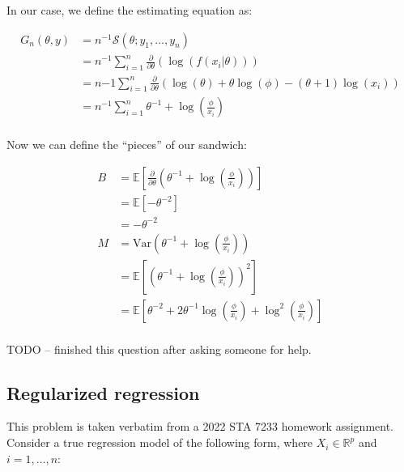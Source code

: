 \documentclass{report}
\begin{document}
In our case, we define the estimating equation as:

\begin{equation}\label{eq:ex-ols-pareto-estimating-equation}
    \begin{aligned}
        G_n(\theta, y) 
          &= n^{-1} \mathcal{S}(\theta; y_1, \dots, y_n) \\
          &= n^{-1} \sum_{i=1}^n \frac{\partial}{\partial\theta} \left(\log(f(x_i | \theta))\right) \\
          &= n{-1} \sum_{i=1}^n \frac{\partial}{\partial\theta} \left(\log(\theta) + \theta\log(\phi) - (\theta + 1)\log(x_i)\right) \\
          &= n^{-1} \sum_{i=1}^n \theta^{-1} + \log\left(\frac{\phi}{x_i}\right) \\
    \end{aligned}
\end{equation}

Now we can define the ``pieces'' of our sandwich:

\begin{equation}\label{eq:ex-ols-pareto-sandwich-pieces}
    \begin{aligned}
        B 
          &= \mathbb{E}\left[\frac{\partial}{\partial\theta} \left(\theta^{-1} + \log\left(\frac{\phi}{x_i}\right)\right)\right] \\
          &= \mathbb{E}\left[-\theta^{-2}\right] \\
          &= -\theta^{-2} \\
        M 
          &= \text{Var}\left(\theta^{-1} + \log\left(\frac{\phi}{x_i}\right)\right) \\
          &= \mathbb{E}\left[\left(\theta^{-1} + \log\left(\frac{\phi}{x_i}\right)\right)^2\right] \\
          &= \mathbb{E}\left[\theta^{-2} + 2\theta^{-1}\log\left(\frac{\phi}{x_i}\right) + \log^2\left(\frac{\phi}{x_i}\right)\right] \\
    \end{aligned}
\end{equation}

TODO -- finished this question after asking someone for help.

\subsection{Regularized regression}

This problem is taken verbatim from a 2022 STA 7233 homework assignment. Consider a true regression model of the following form, where $X_i \in \mathbb{R}^p$ and $i = 1, \dots, n$:
\end{document}
